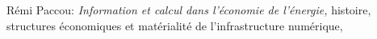 \thispagestyle{empty}
\hfill

\vfill

\noindent Rémi Paccou: \emph{Information et calcul dans l'économie de l'énergie,}
histoire, structures économiques et matérialité de l'infrastructure numérique,
\textcopyright{} \the\year
